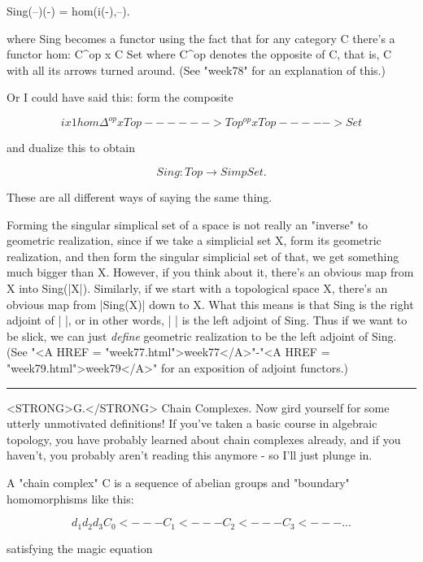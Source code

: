                  Sing(--)(-) = hom(i(-),--).

where Sing becomes a functor using the fact that for any category C
there's a functor 
hom: C^{op} x C \to  Set
where C^{op} denotes the opposite of C, that is, C
with all its arrows turned around.  (See
"week78" for an explanation of this.)

Or I could have said this: form the composite


$$

                                i x 1               hom
                 \Delta ^{op} x Top ------> Top^{op} x Top -----> Set

$$
    
and dualize this to obtain

$$

                 Sing: Top \to  SimpSet.
$$
    
These are all different ways of saying the same thing.   

Forming the singular simplical set of a space is not really 
an "inverse"
to geometric realization, since if we take a simplicial set X, form its
geometric realization, and then form the singular simplicial set of
that, we get something much bigger than X.  However, if you think about
it, there's an obvious map from X into Sing(|X|).  Similarly, if we
start with a topological space X, there's an obvious map from |Sing(X)|
down to X.  
What this means is that Sing is the right adjoint of | |, or in other
words, | | is the left adjoint of Sing.  Thus if we want to be slick,
we can just \emph{define} geometric realization to be the left adjoint of
Sing. (See "<A HREF = "week77.html">week77</A>"-"<A HREF = "week79.html">week79</A>" for an exposition of adjoint functors.)

\par\noindent\rule{\textwidth}{0.4pt}
<STRONG>G.</STRONG>  Chain Complexes.  Now gird yourself for some utterly unmotivated
definitions!  If you've taken a basic course in algebraic topology, you
have probably learned about chain complexes already, and if you haven't,
you probably aren't reading this anymore - so I'll just plunge in.


 A "chain complex" C is a sequence of abelian groups and
"boundary" homomorphisms like this:

$$


                 d_{1}      d_{2}      d_{3}
            C_{0} <--- C_{1} <--- C_{2} <--- C_{3} <--- ...
$$
    
satisfying the magic equation

